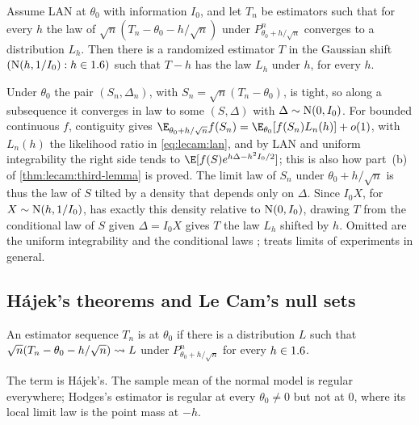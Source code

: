 \begin{refsection}
\begin{theorem}\label{thm:lecam:representation}
Assume LAN at $\theta_0$ with information $I_0$, and let $T_n$ be estimators such that for every $h$ the law of $\sqrt n(T_n-\theta_0-h/\sqrt n)$ under $P^n_{\theta_0+h/\sqrt n}$ converges to a distribution $L_h$. Then there is a randomized estimator $T$ in the Gaussian shift $(\mathrm{N}(h,1/I_0):h\in1.6)$ such that $T-h$ has the law $L_h$ under $h$, for every $h$.
\end{theorem}

\begin{proofsketch}
Under $\theta_0$ the pair $(S_n,\Delta_n)$, with $S_n=\sqrt n(T_n-\theta_0)$, is tight, so along a subsequence it converges in law to some $(S,\Delta)$ with $\Delta\sim\mathrm{N}(0,I_0)$. For bounded continuous $f$, contiguity gives $\E_{\theta_0+h/\sqrt n}f(S_n)=\E_{\theta_0}[f(S_n)L_n(h)]+o(1)$, with $L_n(h)$ the likelihood ratio in \eqref{eq:lecam:lan}, and by LAN and uniform integrability the right side tends to $\E[f(S)e^{h\Delta-h^2I_0/2}]$; this is also how part~(b) of \cref{thm:lecam:third-lemma} is proved. The limit law of $S_n$ under $\theta_0+h/\sqrt n$ is thus the law of $S$ tilted by a density that depends only on $\Delta$. Since $I_0X$, for $X\sim\mathrm{N}(h,1/I_0)$, has exactly this density relative to $\mathrm{N}(0,I_0)$, drawing $T$ from the conditional law of $S$ given $\Delta=I_0X$ gives $T$ the law $L_h$ shifted by $h$. Omitted are the uniform integrability and the conditional laws \parencite[Chapters~7 and~9]{vanderVaart1998}; \textcite{LeCam1972} treats limits of experiments in general.
\end{proofsketch}

\subsection{Hájek's theorems and Le Cam's null sets}

\begin{definition}\label{def:lecam:regular}
An estimator sequence $T_n$ is  at $\theta_0$ if there is a distribution $L$ such that $\sqrt n(T_n-\theta_0-h/\sqrt n)\rightsquigarrow L$ under $P^n_{\theta_0+h/\sqrt n}$ for every $h\in1.6$.
\end{definition}

The term is Hájek's. The sample mean of the normal model is regular everywhere; Hodges's estimator is regular at every $\theta_0\ne0$ but not at $0$, where its local limit law is the point mass at $-h$.


\end{refsection}
